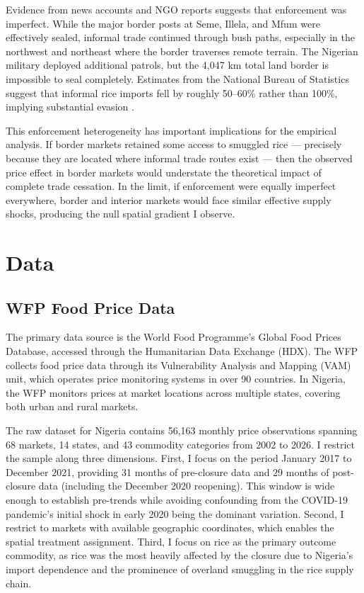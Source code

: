 \documentclass[12pt]{article}
\begin{document}
Evidence from news accounts and NGO reports suggests that enforcement was imperfect. While the major border posts at Seme, Illela, and Mfum were effectively sealed, informal trade continued through bush paths, especially in the northwest and northeast where the border traverses remote terrain. The Nigerian military deployed additional patrols, but the 4,047 km total land border is impossible to seal completely. Estimates from the National Bureau of Statistics suggest that informal rice imports fell by roughly 50--60\% rather than 100\%, implying substantial evasion \citep{wfp2020nigeria}.

This enforcement heterogeneity has important implications for the empirical analysis. If border markets retained some access to smuggled rice --- precisely because they are located where informal trade routes exist --- then the observed price effect in border markets would understate the theoretical impact of complete trade cessation. In the limit, if enforcement were equally imperfect everywhere, border and interior markets would face similar effective supply shocks, producing the null spatial gradient I observe.


\section{Data}
\label{sec:data}

\subsection{WFP Food Price Data}

The primary data source is the World Food Programme's Global Food Prices Database, accessed through the Humanitarian Data Exchange (HDX). The WFP collects food price data through its Vulnerability Analysis and Mapping (VAM) unit, which operates price monitoring systems in over 90 countries. In Nigeria, the WFP monitors prices at market locations across multiple states, covering both urban and rural markets.

The raw dataset for Nigeria contains 56,163 monthly price observations spanning 68 markets, 14 states, and 43 commodity categories from 2002 to 2026. I restrict the sample along three dimensions. First, I focus on the period January 2017 to December 2021, providing 31 months of pre-closure data and 29 months of post-closure data (including the December 2020 reopening). This window is wide enough to establish pre-trends while avoiding confounding from the COVID-19 pandemic's initial shock in early 2020 being the dominant variation. Second, I restrict to markets with available geographic coordinates, which enables the spatial treatment assignment. Third, I focus on rice as the primary outcome commodity, as rice was the most heavily affected by the closure due to Nigeria's import dependence and the prominence of overland smuggling in the rice supply chain.
\end{document}
